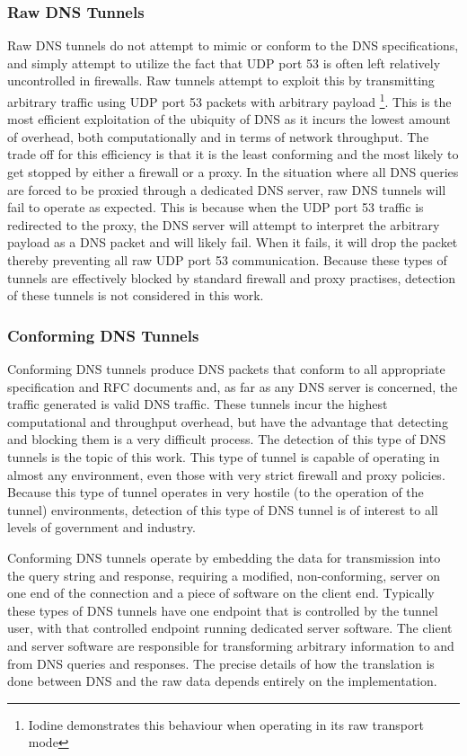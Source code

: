 \documentclass{llncs}
\begin{document}
\subsubsection{Raw DNS Tunnels}
\label{tunnels-types-raw}
Raw DNS tunnels do not attempt to mimic or conform to the DNS specifications,
and simply attempt to utilize the fact that UDP port 53 is often left relatively
uncontrolled in firewalls. Raw tunnels attempt to exploit this by transmitting
arbitrary traffic using UDP port 53 packets with arbitrary payload 
\footnote{Iodine demonstrates this behaviour when operating in its raw
transport mode}. This is the most efficient exploitation of the ubiquity of DNS
as it incurs the lowest amount of overhead, both computationally and in terms of
network throughput. The trade off for this efficiency is that it is the least
conforming and the most likely to get stopped by either a firewall or a proxy.
In the situation where all DNS queries are forced to be proxied through a
dedicated DNS server, raw DNS tunnels will fail to operate as expected. This is
because when the UDP port 53 traffic is redirected to the proxy, the DNS server
will attempt to interpret the arbitrary payload as a DNS packet and will likely
fail. When it fails, it will drop the packet thereby preventing all raw UDP port
53 communication. Because these types of tunnels are effectively blocked by
standard firewall and proxy practises, detection of these tunnels is not
considered in this work.

\subsubsection{Conforming DNS Tunnels}
\label{tunnels-types-conforming}
Conforming DNS tunnels produce DNS packets that conform to all appropriate
specification and RFC documents and, as far as any DNS server is concerned, the
traffic generated is valid DNS traffic. These tunnels incur the highest
computational and throughput overhead, but have the advantage that detecting and
blocking them is a very difficult process. The detection of this type of DNS
tunnels is the topic of this work. This type of tunnel is capable of operating
in almost any environment, even those with very strict firewall and proxy policies. Because
this type of tunnel operates in very hostile (to the operation of the tunnel)
environments, detection of this type of DNS tunnel is of interest to all levels
of government and industry.

Conforming DNS tunnels operate by embedding the data for transmission into the
query string and response, requiring a modified, non-conforming, server on one
end of the connection and a piece of software on the client end. Typically these
types of DNS tunnels have one endpoint that is controlled by the tunnel user,
with that controlled endpoint running dedicated server software. The client and
server software are responsible for transforming arbitrary information to and
from DNS queries and responses. The precise details of how the translation is
done between DNS and the raw data depends entirely on the implementation.
\end{document}
